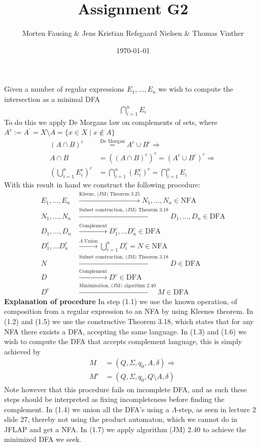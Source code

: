 \documentclass{article}
\theoremstyle{remark}
\numberwithin{equation}{section}
\begin{document}
	\author{Morten Fausing \& Jens Kristian Refsgaard Nielsen \& Thomas Vinther }
	\title{Assignment G2}
	\date{\today}
	\maketitle
	\section{}
	Given a number of regular expressions $E_1,\dots,E_n$ we wish to compute the intersection as a minimal DFA
	\begin{align*}
	\bigcap_{i=1}^n E_i
	\end{align*}
	To do this we apply De Morgans law on complements of sets, where $A^{c}:=A^{'}=X\setminus A=\{x\in X \mid x\notin A \}$
	\begin{align*} 
	(A\cap B)^{c} &\stackrel{\text{De Morgan}}{=} A^{c}\cup B^{c} \Rightarrow\\
	A\cap B &= ((A\cap B)^c)^c = (A^{c}\cup B^{c})^c \Rightarrow\\
	\left(\bigcup_{i=1}^n E_i^c\right)^c &= \bigcap_{i=1}^n (E_i^c)^c = \bigcap_{i=1}^n E_i
	\end{align*}
	With this result in hand we construct the following procedure:
	\begin{align}
	E_1, \dots, E_n &\xrightarrow{\text{Kleene, (JM) Theorem 3.25}} N_1,\dots, N_n \in \text{NFA}\\
	N_1,\dots, N_n &\xrightarrow{\text{Subset construction, (JM) Theorem 3.18}} D_1,\dots, D_n \in \text{DFA}\\
	D_1,\dots, D_n &\xrightarrow{\text{Complement}} D_1^{c}, \dots D_n^{c} \in \text{DFA}  \\
	D_1^{c}, \dots D_n^{c} &\xrightarrow{\Lambda \text{  Union}}\bigcup_{i=1}^n D_i^{c} = N \in \text{NFA}\\
	N &\xrightarrow{\text{Subset construction, (JM) Theorem 3.18}} D \in\text{DFA}\\
	D &\xrightarrow{\text{Complement}} D^c \in\text{DFA}\\
	D^c &\xrightarrow{\text{Minimisation, (JM) algorithm 2.40}} M \in \text{DFA}
	\end{align} 
	\textbf{Explanation of procedure}
	In step (1.1) we use the known operation, of composition from a regular expression to an NFA by using Kleenes theorem. In (1.2) and (1.5) we use the constructive Theorem 3.18, which states that for any NFA there exsists a DFA, accepting the same language. In (1.3) and (1.6) we wish to compute the DFA that accepts complement language, this is simply achieved by
	\begin{align*}
	M &= (Q,\Sigma,q_0,A,\delta) \Rightarrow\\
	M^c &= (Q,\Sigma,q_0,Q\setminus A,\delta)
	\end{align*}
	Note however that this procedure fails on incomplete DFA, and as such these steps should be interpreted as fixing incompleteness before finding the complement.
	In (1.4) we union all the DFA's using a $\Lambda$-step, as seen in lecture 2 slide 27, thereby not using the product automaton, which we cannot do in JFLAP and get a NFA. 
	In (1.7) we apply algorithm (JM) 2.40 to achieve the minimized DFA we seek.
\end{document}

